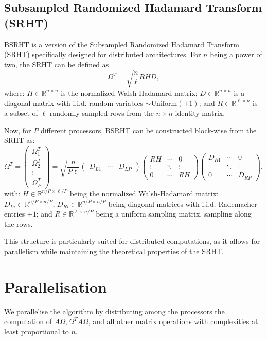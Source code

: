 \documentclass[a4paper, 12pt,oneside]{article}
\begin{document}
\subsection{Subsampled Randomized Hadamard Transform (SRHT)}
BSRHT is a version of the Subsampled Randomized Hadamard Transform (SRHT) specifically designed for distributed architectures. For $n$ being a power of two, the SRHT can be defined as
\[
\Omega^T = \sqrt{\frac{n}{\ell}} RHD,
\]
where: $H \in \mathbb{R}^{n \times n}$ is the normalized Walsh-Hadamard matrix; $D \in \mathbb{R}^{n \times n}$ is a diagonal matrix with i.i.d. random variables $\sim \text{Uniform}(\pm 1)$; and $R \in \mathbb{R}^{\ell \times n}$ is a subset of $\ell$ randomly sampled rows from the $n \times n$ identity matrix.

Now, for $P$ different processors, BSRHT can be constructed block-wise from the SRHT as:
\[
\Omega^T = \begin{pmatrix} \Omega_1^T \\
\Omega_2^T \\
\vdots \\
\Omega_P^T \end{pmatrix} = \sqrt{\frac{n}{P\ell}} \begin{pmatrix} D_{L1} & \cdots & D_{LP} \end{pmatrix}
\begin{pmatrix}
RH & \cdots & 0 \\
\vdots & \ddots & \vdots \\
0 & \cdots & RH
\end{pmatrix}
\begin{pmatrix} D_{R1} & \cdots & 0 \\
\vdots & \ddots & \vdots \\
0 & \cdots & D_{RP} \end{pmatrix}, \tag{2}
\]
with: $H \in \mathbb{R}^{n/P \times \ell/P}$ being the normalized Walsh-Hadamard matrix; $D_{Li} \in \mathbb{R}^{n/P \times n/P}$, $D_{Ri} \in \mathbb{R}^{n/P \times n/P}$ being diagonal matrices with i.i.d. Rademacher entries $\pm 1$; and $R \in \mathbb{R}^{\ell \times n/P}$ being a uniform sampling matrix, sampling along the rows.

This structure is particularly suited for distributed computations, as it allows for parallelism while maintaining the theoretical properties of the SRHT.

	\section{Parallelisation}
	We parallelise the algorithm by distributing among the processors the computation of $A \Omega,\Omega^T A \Omega$, and all other matrix operations with complexities at least proportional to $n$. 
	
\end{document}
